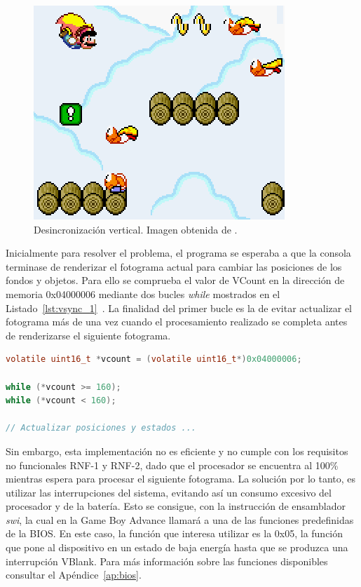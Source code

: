 \begin{figure}[h]
	\centering
	\includegraphics[width=.4\textwidth]{capitulos/capitulo5/torn.png}
	\caption[Desincronización vertical.]{Desincronización vertical. Imagen obtenida de \cite{bib:washington}.}\label{fig:torn}
\end{figure}
\FloatBarrier{}

Inicialmente para resolver el problema, el programa se esperaba a que la consola terminase de renderizar el fotograma actual para cambiar las posiciones de los fondos y objetos. Para ello se comprueba el valor de VCount en la dirección de memoria 0x04000006 mediante dos bucles \textit{while} mostrados en el Listado~\ref{lst:vsync_1}~\cite{bib:tonc}. La finalidad del primer bucle es la de evitar actualizar el fotograma más de una vez cuando el procesamiento realizado se completa antes de renderizarse el siguiente fotograma.

\begin{lstlisting}[language=c,caption={Implementación de VSync mediante dos bucles.},label={lst:vsync_1}]
volatile uint16_t *vcount = (volatile uint16_t*)0x04000006;

while (*vcount >= 160);
while (*vcount < 160);

// Actualizar posiciones y estados ...
\end{lstlisting}

Sin embargo, esta implementación no es eficiente y no cumple con los requisitos no funcionales RNF-1 y RNF-2, dado que el procesador se encuentra al 100\% mientras espera para procesar el siguiente fotograma. La solución por lo tanto, es utilizar las interrupciones del sistema, evitando así un consumo excesivo del procesador y de la batería. Esto se consigue, con la instrucción de ensamblador \textit{swi}, la cual en la Game Boy Advance llamará a una de las funciones predefinidas de la BIOS. En este caso, la función que interesa utilizar es la 0x05, la función que pone al dispositivo en un estado de baja energía hasta que se produzca una interrupción VBlank. Para más información sobre las funciones disponibles consultar el Apéndice~\ref{ap:bios}.

